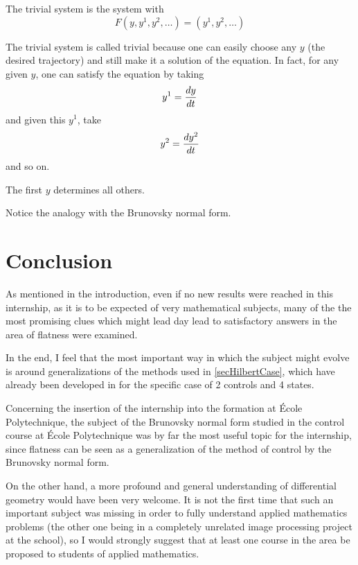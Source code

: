 \documentclass[12pt]{article}
\begin{document}
\begin{definition} \label{def:trivialSystem}
  The trivial system is the system with
  \[ F(y,y^1,y^2,\ldots) =  (y^1,y^2,\ldots) \]
\end{definition}

\begin{remark}
  The trivial system is called trivial because one can easily choose any $y$
  (the desired trajectory) and still make it a solution of the equation.
  In fact, for any given $y$, one can satisfy the equation by taking
  \[ y^1 = \frac{dy}{dt} \]
  and given this $y^1$, take
  \[ y^2 = \frac{dy^2}{dt} \]
  and so on.
  
  The first $y$ determines all others.
  
  Notice the analogy with the Brunovsky normal form.
\end{remark}

\section{Conclusion}

As mentioned in the introduction, even if no new results were reached
in this internship, as it is to be expected of very mathematical subjects, many of the the most promising clues which might
lead day lead to satisfactory answers in the area of flatness were examined.

In the end, I feel that the most important way in which the subject
might evolve is around generalizations of the methods used in \ref{secHilbertCase}, which have already been developed in \cite{AP05}
for the specific case of 2 controls and 4 states.

Concerning the insertion of the internship into the formation at École
Polytechnique, the subject of the Brunovsky normal form studied in
the control course at École Polytechnique was by far the most useful
topic for the internship, since flatness can be seen as a generalization of the method of control by the Brunovsky normal form.

On the other hand, a more profound and general understanding of
differential geometry would have been very welcome. It is not the first
time that such an important subject was missing in order to fully
understand applied mathematics problems (the other one being in a completely unrelated image processing project at the school), so I
would strongly suggest that at least one course in the area be proposed
to students of applied mathematics.
\end{document}
